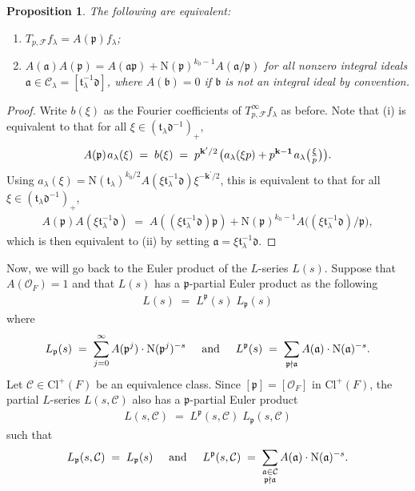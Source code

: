 \documentclass[11pt]{amsart}
\newtheorem{prop}[theorem]{Proposition}
\theoremstyle{remark}
\newcommand\mbf[1]{\mathbf{#1}}
\newcommand\cl[1]{\mathcal{#1}}
\newcommand\fr[1]{\mathfrak{#1}}
\newcommand{\clo}{\mathcal{O}}
\newcommand{\eq}{\;=\;}
\newcommand{\bone}{\mathbf{1}}
\def\thin{{\hskip 1pt}}
\newcommand{\N}{\mathrm{N}}
\newcommand{\Cl}{\mathrm{Cl}}
\begin{document}
\begin{prop}
\label{eigenfourier}
The following are equivalent:
\begin{enumerate}[label=\rm{(\roman*)}]
    \item $T_{p,\cl{F}} f_\lambda=A(\fr{p})f_\lambda$;
    \item $A(\fr{a})A(\fr{p})=A(\fr{a}\fr{p})+\N(\fr{p})^{k_0-1}A(\fr{a}/\fr{p})$ for all nonzero integral ideals $\fr{a}\in\cl{C}_\lambda=[\fr{t}_\lambda^{-1}\fr{d}]$, where \mbox{$A(\fr{b})=0$} if $\fr{b}$ is not an integral ideal by convention.
\end{enumerate}
\end{prop}
\begin{proof}
Write $b(\xi)$ as the Fourier coefficients of $T_{p,\cl{F}}^\infty f_\lambda$ as before. Note that (i) is equivalent to that for all $\xi\in(\fr{t}_\lambda\fr{d}^{-1})_+$,
\begin{align*}
    A(\fr{p})\thin a_\lambda(\xi)\eq b(\xi)\eq p^{\mbf{k}^\prime/2}\thin \big(a_\lambda(\xi p)+p^{\mbf{k}-\bone}\thin a_\lambda\big(\tfrac{\xi}{p}\big)\big).
\end{align*}
Using $a_\lambda(\xi)=\N(\fr{t}_\lambda)^{k_0/2}A(\xi\fr{t}_\lambda^{-1}\fr{d})\xi^{-\mbf{k}^\prime/2}$, this is equivalent to that for all $\xi\in(\fr{t}_\lambda\fr{d}^{-1})_+$,
\begin{align*}
    A(\fr{p})A(\xi\fr{t}_\lambda^{-1}\fr{d})\eq A((\xi\fr{t}_\lambda^{-1}\fr{d})\fr{p})+\N(\fr{p})^{k_0-1}A\big((\xi\fr{t}_\lambda^{-1}\fr{d})/\fr{p}\big),
\end{align*}
which is then equivalent to (ii) by setting $\fr{a}=\xi\fr{t}_\lambda^{-1}\fr{d}$.
\end{proof}

Now, we will go back to the Euler product of the $L$-series $L(s)$. Suppose that $A(\clo_F)=1$ and that $L(s)$ has a $\fr{p}$-partial Euler product as the following
\begin{align*}
    L(s)\eq L^\fr{p}(s)\;L_\fr{p}(s)
\end{align*}
where
\begin{align*}
    L_\fr{p}(s)\eq\sum_{j=0}^{\infty}A(\fr{p}^j)\cdot\N(\fr{p}^j)^{-s}\hspace{0.5cm}\text{and}\hspace{0.5cm}
    L^\fr{p}(s)\eq\sum_{\fr{p}\nmid\fr{a}}A(\fr{a})\cdot\N(\fr{a})^{-s}.
\end{align*}
Let $\cl{C}\in\Cl^+(F)$ be an equivalence class. Since $[\fr{p}]=[\clo_F]$ in $\Cl^+(F)$, the partial $L$-series $L(s,\cl{C})$ also has a $\fr{p}$-partial Euler product
\begin{align*}
    L(s,\cl{C})\eq L^\fr{p}(s,\cl{C})\;L_\fr{p}(s,\cl{C})
\end{align*}
such that 
\begin{align*}
    L_\fr{p}(s,\cl{C})\eq L_\fr{p}(s)\hspace{0.5cm}\text{and}\hspace{0.5cm}
    L^\fr{p}(s,\cl{C})\eq\sum_{\substack{\fr{a}\in\cl{C}\\\fr{p}\nmid\fr{a}}}A(\fr{a})\cdot\N(\fr{a})^{-s}.
\end{align*}
\end{document}
